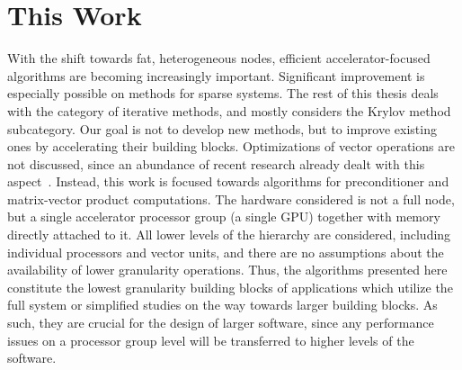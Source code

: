 \section{This Work}

With the shift towards fat, heterogeneous nodes, efficient accelerator-focused
algorithms are becoming increasingly important. Significant improvement is
especially possible on methods for sparse systems. The rest of this thesis deals
with the category of iterative methods, and mostly considers the Krylov method
subcategory. Our goal is not to develop new methods, but to improve existing
ones by accelerating their building blocks. Optimizations of vector operations
are not discussed, since an abundance of recent research already dealt with this
aspect~\cite{joaqin-thesis}. Instead, this work is focused towards algorithms
for preconditioner and matrix-vector product computations. The hardware
considered is not a full node, but a single accelerator processor group (\ie a
single GPU) together with memory directly attached to it. All lower levels of
the hierarchy are considered, including individual processors and vector units,
and there are no assumptions about the availability of lower granularity
operations. Thus, the algorithms presented here constitute the lowest
granularity building blocks of applications which utilize the full system or
simplified studies on the way towards larger building blocks. As such, they are
crucial for the design of larger software, since any performance issues on a
processor group level will be transferred to higher levels of the software.

